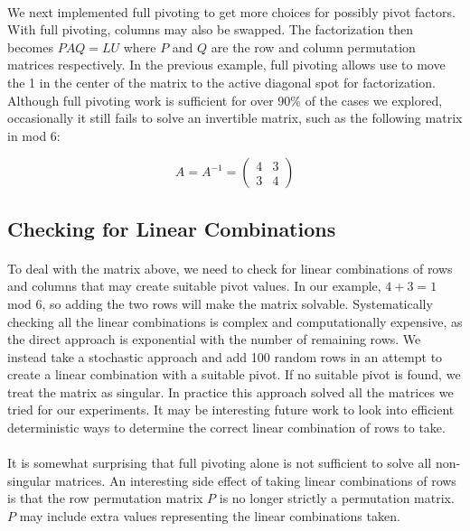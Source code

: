\documentclass[11pt]{article}
\begin{document}
\paragraph{} We next implemented full pivoting to get more choices for possibly pivot factors.  With full pivoting, columns may also be swapped.  The factorization then becomes $PAQ = LU$ where $P$ and $Q$ are the row and column permutation matrices respectively.  In the previous example, full pivoting allows use to move the 1 in the center of the matrix to the active diagonal spot for factorization.  Although full pivoting work is sufficient for over 90\% of the cases we explored, occasionally it still fails to solve an invertible matrix, such as the following matrix in mod 6:

\[
A = A^{-1} =
\begin{pmatrix}
4 & 3 \\
3 & 4
\end{pmatrix}
\]

\subsection*{Checking for Linear Combinations}
\paragraph{} To deal with the matrix above, we need to check for linear combinations of rows and columns that may create suitable pivot values.  In our example, $4 + 3 = 1$ mod 6, so adding the two rows will make the matrix solvable.  Systematically checking all the linear combinations is complex and computationally expensive, as the direct approach is exponential with the number of remaining rows.  We instead take a stochastic approach and add 100 random rows in an attempt to create a linear combination with a suitable pivot.  If no suitable pivot is found, we treat the matrix as singular.  In practice this approach solved all the matrices we tried for our experiments.  It may be interesting future work to look into efficient deterministic ways to determine the correct linear combination of rows to take.


\paragraph{} It is somewhat surprising that full pivoting alone is not sufficient to solve all non-singular matrices.  An interesting side effect of taking linear combinations of rows is that the row permutation matrix $P$ is no longer strictly a permutation matrix.  $P$ may include extra values representing the linear combinations taken.
\end{document}
